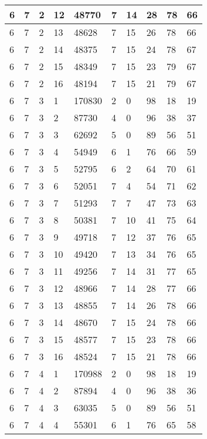 \begin{table}[!ht]
\begin{tabular}{|l|l|l|l|l|l|l|l|l|l|}
        6 & 7 & 2 & 12 & 48770 & 7 & 14 & 28 & 78 & 66 \\ \hline
        6 & 7 & 2 & 13 & 48628 & 7 & 15 & 26 & 78 & 66 \\ \hline
        6 & 7 & 2 & 14 & 48375 & 7 & 15 & 24 & 78 & 67 \\ \hline
        6 & 7 & 2 & 15 & 48349 & 7 & 15 & 23 & 79 & 67 \\ \hline
        6 & 7 & 2 & 16 & 48194 & 7 & 15 & 21 & 79 & 67 \\ \hline
        6 & 7 & 3 & 1 & 170830 & 2 & 0 & 98 & 18 & 19 \\ \hline
        6 & 7 & 3 & 2 & 87730 & 4 & 0 & 96 & 38 & 37 \\ \hline
        6 & 7 & 3 & 3 & 62692 & 5 & 0 & 89 & 56 & 51 \\ \hline
        6 & 7 & 3 & 4 & 54949 & 6 & 1 & 76 & 66 & 59 \\ \hline
        6 & 7 & 3 & 5 & 52795 & 6 & 2 & 64 & 70 & 61 \\ \hline
        6 & 7 & 3 & 6 & 52051 & 7 & 4 & 54 & 71 & 62 \\ \hline
        6 & 7 & 3 & 7 & 51293 & 7 & 7 & 47 & 73 & 63 \\ \hline
        6 & 7 & 3 & 8 & 50381 & 7 & 10 & 41 & 75 & 64 \\ \hline
        6 & 7 & 3 & 9 & 49718 & 7 & 12 & 37 & 76 & 65 \\ \hline
        6 & 7 & 3 & 10 & 49420 & 7 & 13 & 34 & 76 & 65 \\ \hline
        6 & 7 & 3 & 11 & 49256 & 7 & 14 & 31 & 77 & 65 \\ \hline
        6 & 7 & 3 & 12 & 48966 & 7 & 14 & 28 & 77 & 66 \\ \hline
        6 & 7 & 3 & 13 & 48855 & 7 & 14 & 26 & 78 & 66 \\ \hline
        6 & 7 & 3 & 14 & 48670 & 7 & 15 & 24 & 78 & 66 \\ \hline
        6 & 7 & 3 & 15 & 48577 & 7 & 15 & 23 & 78 & 66 \\ \hline
        6 & 7 & 3 & 16 & 48524 & 7 & 15 & 21 & 78 & 66 \\ \hline
        6 & 7 & 4 & 1 & 170988 & 2 & 0 & 98 & 18 & 19 \\ \hline
        6 & 7 & 4 & 2 & 87894 & 4 & 0 & 96 & 38 & 36 \\ \hline
        6 & 7 & 4 & 3 & 63035 & 5 & 0 & 89 & 56 & 51 \\ \hline
        6 & 7 & 4 & 4 & 55301 & 6 & 1 & 76 & 65 & 58 \\ \hline

\end{tabular}
\end{table}

